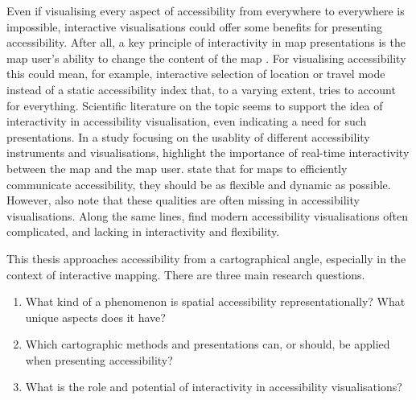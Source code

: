 Even if visualising every aspect of accessibility
from everywhere to everywhere is impossible,
interactive visualisations could offer some benefits for presenting accessibility.
After all, a key principle of interactivity in map presentations is
the map user's ability to change the content of the map \parencite{rot2013b}.
For visualising accessibility this could mean, for example,
interactive selection of location or travel mode instead of
a static accessibility index that, to a varying extent,
tries to account for everything.
Scientific literature on the topic seems to support the idea of
interactivity in accessibility visualisation,
even indicating a need for such presentations.
In a study focusing on the usablity of
different accessibility instruments and visualisations,  %
\textcite{te2014} highlight the importance of
real-time interactivity between the map and the map user.
\textcite{but2018} state that for maps to efficiently communicate accessibility,
they should be as flexible and dynamic as possible.
However, \textcite{but2018} also note that
these qualities are often missing in accessibility visualisations.
Along the same lines, \textcite{paj2021} find modern accessibility visualisations often complicated,
and lacking in interactivity and flexibility.

This thesis approaches accessibility from a cartographical angle,
especially in the context of interactive mapping.
There are three main research questions.
\begin{enumerate}
	\item What kind of a phenomenon is spatial accessibility representationally?
	What unique aspects does it have?
	\item Which cartographic methods and presentations can, or should, 
	be applied when presenting accessibility?
	\item What is the role and potential of interactivity in accessibility visualisations?
\end{enumerate}

